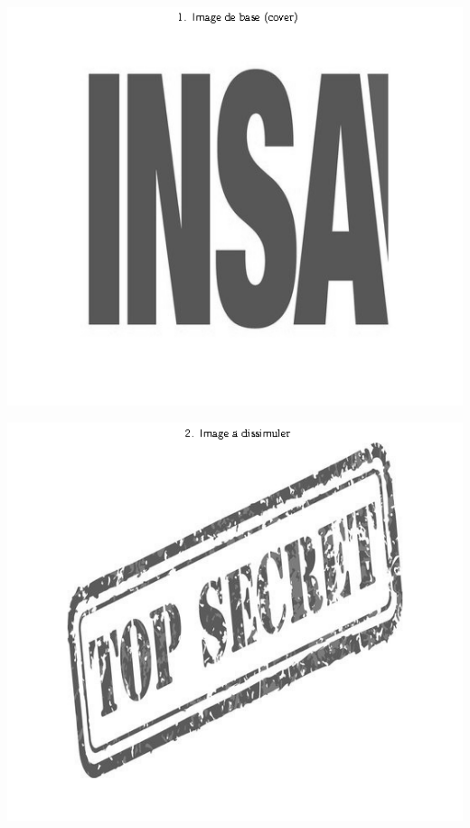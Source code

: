 \begin{minipage}{.5\textwidth}\centering
	\includegraphics[scale=0.4]{images/fig1.png}
	\label{fig1}
\end{minipage}
\begin{minipage}{.5\textwidth}\centering
	\includegraphics[scale=0.4]{images/fig2.png}
	\label{fig2}
\end{minipage}


